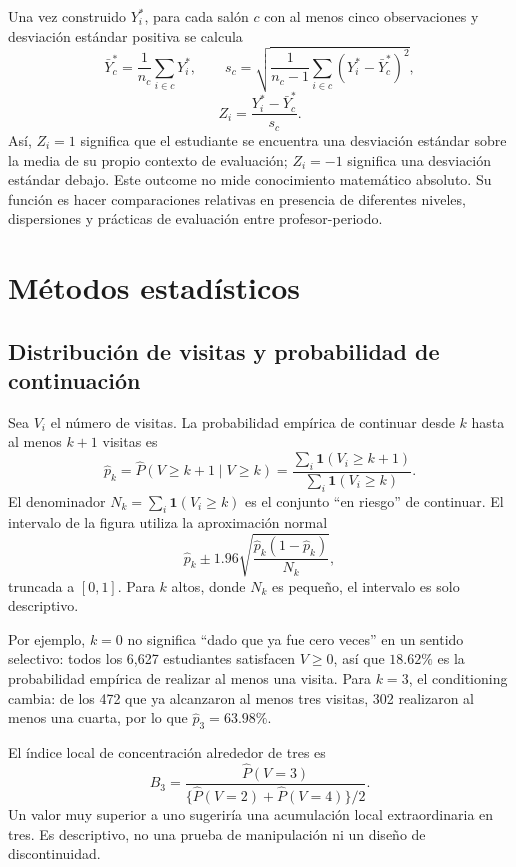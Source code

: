 \documentclass[11pt,letterpaper]{article}
\begin{document}
Una vez construido $Y_i^*$, para cada salón $c$ con al menos cinco observaciones y desviación estándar positiva se calcula
\[
\bar Y_c^*=\frac{1}{n_c}\sum_{i\in c}Y_i^*,\qquad
s_c=\sqrt{\frac{1}{n_c-1}\sum_{i\in c}(Y_i^*-\bar Y_c^*)^2},
\]
\[
Z_i=\frac{Y_i^*-\bar Y_c^*}{s_c}.
\]
Así, $Z_i=1$ significa que el estudiante se encuentra una desviación estándar sobre la media de su propio contexto de evaluación; $Z_i=-1$ significa una desviación estándar debajo. Este outcome no mide conocimiento matemático absoluto. Su función es hacer comparaciones relativas en presencia de diferentes niveles, dispersiones y prácticas de evaluación entre profesor-periodo.

\section{Métodos estadísticos}

\subsection{Distribución de visitas y probabilidad de continuación}

Sea $V_i$ el número de visitas. La probabilidad empírica de continuar desde $k$ hasta al menos $k+1$ visitas es
\[
\widehat p_k=\widehat P(V\ge k+1\mid V\ge k)
=\frac{\sum_i\mathbf 1(V_i\ge k+1)}{\sum_i\mathbf 1(V_i\ge k)}.
\]
El denominador $N_k=\sum_i\mathbf 1(V_i\ge k)$ es el conjunto ``en riesgo'' de continuar. El intervalo de la figura utiliza la aproximación normal
\[
\widehat p_k\pm1.96\sqrt{\frac{\widehat p_k(1-\widehat p_k)}{N_k}},
\]
truncada a $[0,1]$. Para $k$ altos, donde $N_k$ es pequeño, el intervalo es solo descriptivo.

\begin{table}[H]
\centering
\caption{Ejemplo numérico de la curva de continuación en MU}

\end{table}

Por ejemplo, $k=0$ no significa ``dado que ya fue cero veces'' en un sentido selectivo: todos los 6,627 estudiantes satisfacen $V\ge0$, así que $18.62\%$ es la probabilidad empírica de realizar al menos una visita. Para $k=3$, el conditioning cambia: de los 472 que ya alcanzaron al menos tres visitas, 302 realizaron al menos una cuarta, por lo que $\widehat p_3=63.98\%$.

El índice local de concentración alrededor de tres es
\[
B_3=\frac{\widehat P(V=3)}{\{\widehat P(V=2)+\widehat P(V=4)\}/2}.
\]
Un valor muy superior a uno sugeriría una acumulación local extraordinaria en tres. Es descriptivo, no una prueba de manipulación ni un diseño de discontinuidad.
\end{document}
